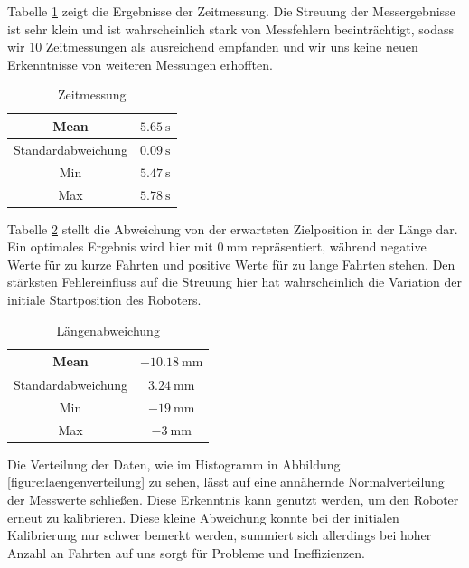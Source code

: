 \documentclass[ngerman]{tudscrreprt}
\begin{document}
Tabelle \ref{table:zeitmessung} zeigt die Ergebnisse der Zeitmessung. Die Streuung der Messergebnisse ist sehr klein und ist wahrscheinlich stark von Messfehlern beeinträchtigt, sodass wir 10 Zeitmessungen als ausreichend empfanden und wir uns keine neuen Erkenntnisse von weiteren Messungen erhofften.
%
\begin{table}[H]
    \centering
    \begin{tabular}{|c|c|}
    \hline
    Mean               & $\SI{5,65}{\s}$ \\ \hline
    Standardabweichung & $\SI{0,09}{\s}$ \\ \hline
    Min                & $\SI{5,47}{\s}$ \\ \hline
    Max                & $\SI{5,78}{\s}$ \\ \hline
    \end{tabular}
    \caption{Zeitmessung}
    \label{table:zeitmessung}
\end{table}
%
Tabelle \ref{table:laengenabweichung} stellt die Abweichung von der erwarteten Zielposition in der Länge dar. Ein optimales Ergebnis wird hier mit $\SI{0}{\mm}$ repräsentiert, während negative Werte für zu kurze Fahrten und positive Werte für zu lange Fahrten stehen. Den stärksten Fehlereinfluss auf die Streuung hier hat wahrscheinlich die Variation der initiale Startposition des Roboters.
%
\begin{table}[H]
    \centering
    \begin{tabular}{|c|c|}
    \hline
    Mean               & $\SI{-10,18}{\mm}$ \\ \hline
    Standardabweichung & $\SI{3,24}{\mm}$ \\ \hline
    Min                & $\SI{-19}{\mm}$ \\ \hline
    Max                & $\SI{-3}{\mm}$ \\ \hline
    \end{tabular}
    \caption{Längenabweichung}
    \label{table:laengenabweichung}
\end{table}
%
Die Verteilung der Daten, wie im Histogramm in Abbildung \ref{figure:laengenverteilung} zu sehen, lässt auf eine annähernde Normalverteilung der Messwerte schließen. Diese Erkenntnis kann genutzt werden, um den Roboter erneut zu kalibrieren. Diese kleine Abweichung konnte bei der initialen Kalibrierung nur schwer bemerkt werden, summiert sich allerdings bei hoher Anzahl an Fahrten auf uns sorgt für Probleme und Ineffizienzen.
%
\end{document}
